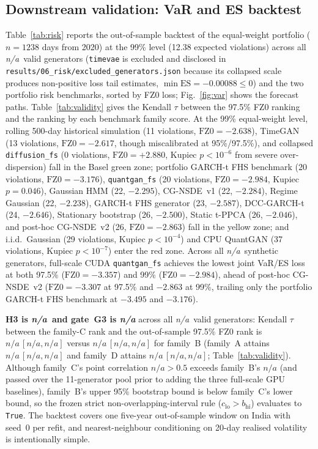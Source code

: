 \documentclass[journal]{IEEEtran}
\newcommand{\pendingnum}{\textit{n/a}}
\providecommand{\nRiskGenerators}{\pendingnum}
\providecommand{\tauRiskA}{\pendingnum}
\providecommand{\tauRiskALo}{\pendingnum}
\providecommand{\tauRiskAHi}{\pendingnum}
\providecommand{\tauRiskB}{\pendingnum}
\providecommand{\tauRiskBLo}{\pendingnum}
\providecommand{\tauRiskBHi}{\pendingnum}
\providecommand{\tauRiskC}{\pendingnum}
\providecommand{\tauRiskCLo}{\pendingnum}
\providecommand{\tauRiskCHi}{\pendingnum}
\providecommand{\tauRiskD}{\pendingnum}
\providecommand{\tauRiskDLo}{\pendingnum}
\providecommand{\tauRiskDHi}{\pendingnum}
\providecommand{\verdictHThree}{\pendingnum}
\providecommand{\verdictGThree}{\pendingnum}
\begin{document}
\subsection{Downstream validation: VaR and ES backtest}
Table~\ref{tab:risk} reports the out-of-sample backtest of the equal-weight portfolio ($n=1238$ days from
2020) at the 99\% level (12.38 expected violations) across all \nRiskGenerators\ valid generators
(\texttt{timevae} is excluded and disclosed in \texttt{results/06\_risk/excluded\_generators.json} because its
collapsed scale produces non-positive loss tail estimates, $\min\mathrm{ES}=-0.00088 \le 0$) and the two
portfolio risk benchmarks, sorted by FZ0 loss; Fig.~\ref{fig:var} shows the forecast paths.
Table~\ref{tab:validity} gives the Kendall $\tau$ between the 97.5\% FZ0 ranking and the ranking by each
benchmark family score. At the 99\% equal-weight level, rolling 500-day historical simulation (11 violations,
$\mathrm{FZ0}=-2.638$), TimeGAN (13 violations, $\mathrm{FZ0}=-2.617$, though miscalibrated at 95\%/97.5\%),
and collapsed \texttt{diffusion\_fs} (0 violations, $\mathrm{FZ0}=+2.880$, Kupiec $p < 10^{-6}$ from severe
over-dispersion) fall in the Basel green zone; portfolio GARCH-t FHS benchmark (20 violations,
$\mathrm{FZ0}=-3.176$), \texttt{quantgan\_fs} (20 violations, $\mathrm{FZ0}=-2.984$, Kupiec $p=0.046$),
Gaussian HMM (22, $-2.295$), CG-NSDE~v1 (22, $-2.284$), Regime Gaussian (22, $-2.238$), GARCH-t FHS
generator (23, $-2.587$), DCC-GARCH-t (24, $-2.646$), Stationary bootstrap (26, $-2.500$), Static t-PPCA
(26, $-2.046$), and post-hoc CG-NSDE~v2 (26, $\mathrm{FZ0}=-2.863$) fall in the yellow zone; and i.i.d.\
Gaussian (29 violations, Kupiec $p < 10^{-4}$) and CPU QuantGAN (37 violations, Kupiec $p < 10^{-7}$) enter the
red zone. Across all \nRiskGenerators\ synthetic generators, full-scale CUDA \texttt{quantgan\_fs} achieves the
lowest joint VaR/ES loss at both 97.5\% ($\mathrm{FZ0}=-3.357$) and 99\% ($\mathrm{FZ0}=-2.984$), ahead of
post-hoc CG-NSDE~v2 ($\mathrm{FZ0}=-3.307$ at 97.5\% and $-2.863$ at 99\%, trailing only the portfolio GARCH-t
FHS benchmark at $-3.495$ and $-3.176$).

\textbf{H3 is \verdictHThree\ and gate~G3 is \verdictGThree} across all \nRiskGenerators\ valid generators:
Kendall $\tau$ between the family-C rank and the out-of-sample 97.5\% FZ0 rank is
$\tauRiskC\,[\tauRiskCLo,\tauRiskCHi]$ versus $\tauRiskB\,[\tauRiskBLo,\tauRiskBHi]$ for family~B (family~A
attains $\tauRiskA\,[\tauRiskALo,\tauRiskAHi]$ and family~D attains $\tauRiskD\,[\tauRiskDLo,\tauRiskDHi]$;
Table~\ref{tab:validity}). Although family~C's point correlation $\tauRiskC > 0.5$ exceeds
family~B's $\tauRiskB$ (and passed over the 11-generator pool prior to adding the three full-scale GPU
baselines), family~B's upper 95\% bootstrap bound is below family~C's lower bound, so the frozen
strict non-overlapping-interval rule ($c_{\mathrm{lo}} > b_{\mathrm{hi}}$) evaluates to \texttt{True}. The
backtest covers one five-year out-of-sample window on India with seed~0 per refit, and nearest-neighbour
conditioning on 20-day realised volatility is intentionally simple.
\end{document}
